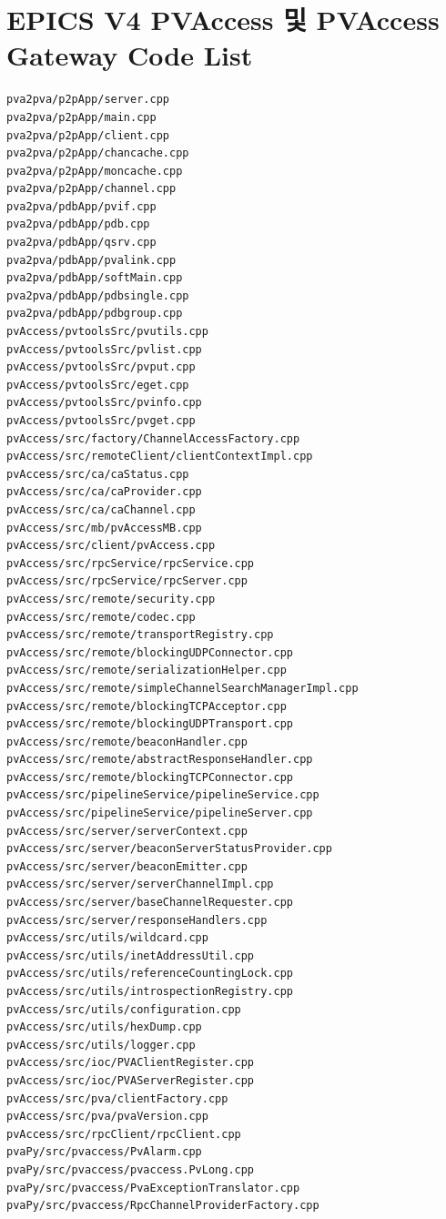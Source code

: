 \documentclass[11pt
  , a4paper
  , article
  , oneside
]{memoir}
\begin{document}
\section{EPICS V4 PVAccess 및 PVAccess Gateway Code List}
\begin{lstlisting}[style=termstylenumber, caption={Code List}, label={list:nfsroot-file}]
pva2pva/p2pApp/server.cpp
pva2pva/p2pApp/main.cpp
pva2pva/p2pApp/client.cpp
pva2pva/p2pApp/chancache.cpp
pva2pva/p2pApp/moncache.cpp
pva2pva/p2pApp/channel.cpp
pva2pva/pdbApp/pvif.cpp
pva2pva/pdbApp/pdb.cpp
pva2pva/pdbApp/qsrv.cpp
pva2pva/pdbApp/pvalink.cpp
pva2pva/pdbApp/softMain.cpp
pva2pva/pdbApp/pdbsingle.cpp
pva2pva/pdbApp/pdbgroup.cpp
pvAccess/pvtoolsSrc/pvutils.cpp
pvAccess/pvtoolsSrc/pvlist.cpp
pvAccess/pvtoolsSrc/pvput.cpp
pvAccess/pvtoolsSrc/eget.cpp
pvAccess/pvtoolsSrc/pvinfo.cpp
pvAccess/pvtoolsSrc/pvget.cpp
pvAccess/src/factory/ChannelAccessFactory.cpp
pvAccess/src/remoteClient/clientContextImpl.cpp
pvAccess/src/ca/caStatus.cpp
pvAccess/src/ca/caProvider.cpp
pvAccess/src/ca/caChannel.cpp
pvAccess/src/mb/pvAccessMB.cpp
pvAccess/src/client/pvAccess.cpp
pvAccess/src/rpcService/rpcService.cpp
pvAccess/src/rpcService/rpcServer.cpp
pvAccess/src/remote/security.cpp
pvAccess/src/remote/codec.cpp
pvAccess/src/remote/transportRegistry.cpp
pvAccess/src/remote/blockingUDPConnector.cpp
pvAccess/src/remote/serializationHelper.cpp
pvAccess/src/remote/simpleChannelSearchManagerImpl.cpp
pvAccess/src/remote/blockingTCPAcceptor.cpp
pvAccess/src/remote/blockingUDPTransport.cpp
pvAccess/src/remote/beaconHandler.cpp
pvAccess/src/remote/abstractResponseHandler.cpp
pvAccess/src/remote/blockingTCPConnector.cpp
pvAccess/src/pipelineService/pipelineService.cpp
pvAccess/src/pipelineService/pipelineServer.cpp
pvAccess/src/server/serverContext.cpp
pvAccess/src/server/beaconServerStatusProvider.cpp
pvAccess/src/server/beaconEmitter.cpp
pvAccess/src/server/serverChannelImpl.cpp
pvAccess/src/server/baseChannelRequester.cpp
pvAccess/src/server/responseHandlers.cpp
pvAccess/src/utils/wildcard.cpp
pvAccess/src/utils/inetAddressUtil.cpp
pvAccess/src/utils/referenceCountingLock.cpp
pvAccess/src/utils/introspectionRegistry.cpp
pvAccess/src/utils/configuration.cpp
pvAccess/src/utils/hexDump.cpp
pvAccess/src/utils/logger.cpp
pvAccess/src/ioc/PVAClientRegister.cpp
pvAccess/src/ioc/PVAServerRegister.cpp
pvAccess/src/pva/clientFactory.cpp
pvAccess/src/pva/pvaVersion.cpp
pvAccess/src/rpcClient/rpcClient.cpp
pvaPy/src/pvaccess/PvAlarm.cpp
pvaPy/src/pvaccess/pvaccess.PvLong.cpp
pvaPy/src/pvaccess/PvaExceptionTranslator.cpp
pvaPy/src/pvaccess/RpcChannelProviderFactory.cpp

\end{lstlisting}
\end{document}
